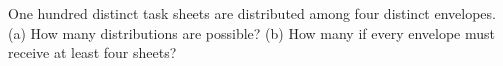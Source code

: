 One hundred distinct task sheets are distributed among four distinct envelopes. (a) How many distributions are possible? (b) How many if every envelope must receive at least four sheets?
